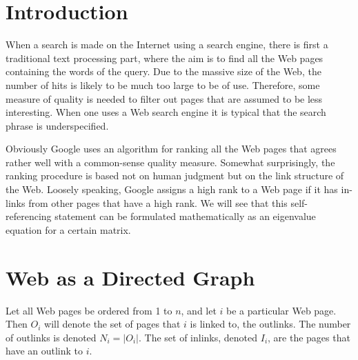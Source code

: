 \documentclass[a4paper]{article}
\begin{document}
\section{Introduction} %
\label{sec:introduction}
When a search is made on the Internet using a search engine, there is first a traditional
text processing part, where the aim is to find all the Web pages containing
the words of the query. Due to the massive size of the Web, the number of hits
is likely to be much too large to be of use. Therefore, some measure of quality is needed to filter out pages that are assumed to be less interesting.
When one uses a Web search engine it is typical that the search phrase is
underspecified.  
\\
\par Obviously Google uses an algorithm for ranking all the Web pages that agrees
rather well with a common-sense quality measure. Somewhat surprisingly, the ranking
procedure is based not on human judgment but on the link structure of the Web.
Loosely speaking, Google assigns a high rank to a Web page if it has in-links from
other pages that have a high rank. We will see that this self-referencing statement
can be formulated mathematically as an eigenvalue equation for a certain matrix.

\section{Web as a Directed Graph} %
\label{sec:foundations}
Let all Web pages be ordered from 1 to $n$, and let $i$ be a particular Web page.
Then $O_i$ will denote the set of pages that $i$ is linked to, the outlinks. The number of outlinks is denoted $N_i = |O_i|$. The set of inlinks, denoted $I_i$, are the pages that have an outlink to $i$.
\\
\end{document}
